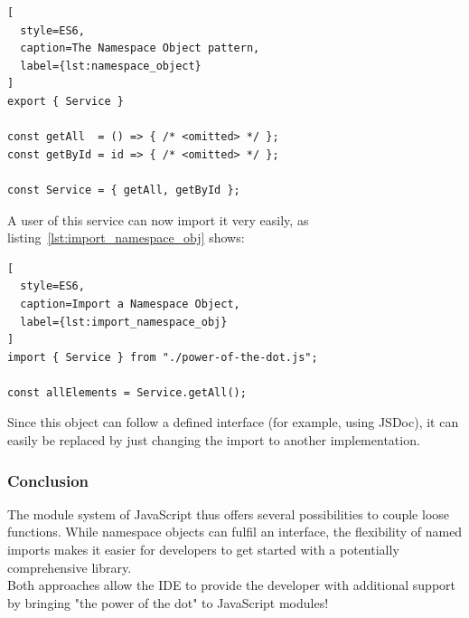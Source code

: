 \begin{lstlisting}[
  style=ES6,
  caption=The Namespace Object pattern,
  label={lst:namespace_object}
]
export { Service }

const getAll  = () => { /* <omitted> */ };
const getById = id => { /* <omitted> */ };

const Service = { getAll, getById };
\end{lstlisting}

A user of this service can now import it very easily, as
listing~\ref{lst:import_namespace_obj} shows:

\begin{lstlisting}[
  style=ES6,
  caption=Import a Namespace Object,
  label={lst:import_namespace_obj}
]
import { Service } from "./power-of-the-dot.js";

const allElements = Service.getAll();
\end{lstlisting}

Since this object can follow a defined interface (for example, using JSDoc), it
can easily be replaced by just changing the import to another implementation.

\subsubsection{Conclusion} %
\label{subsub:Power_of_the_dot_Conclusion}
The module system of JavaScript thus offers several possibilities to couple
loose functions. While namespace objects can fulfil an interface, the
flexibility of named imports makes it easier for developers to get started with
a potentially comprehensive library. \\ 
Both approaches allow the IDE to provide the developer with additional support by
bringing "the power of the dot" to JavaScript modules!

